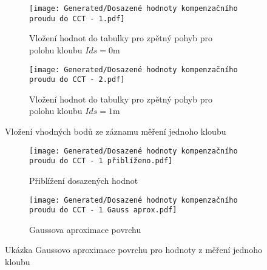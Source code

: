 \begin{landscapeimagepage}
    \begin{figure}[H]
        \centering
        \begin{subfigure}{.5\textheight}
            \centering
            \texttt{[image: Generated/Dosazené hodnoty kompenzačního proudu do CCT - 1.pdf]}
            \caption{Vložení hodnot do tabulky pro zpětný pohyb pro polohu kloubu $Ids = 0 $m}
            \label{fig:Vložení hodnot do tabulky pro zpětný pohyb pro polohu kloubu Ids = 0 m}
        \end{subfigure}
        \hspace{2.5cm}
        \begin{subfigure}{.5\textheight}
            \centering
            \texttt{[image: Generated/Dosazené hodnoty kompenzačního proudu do CCT - 2.pdf]}
            \caption{Vložení hodnot do tabulky pro zpětný pohyb pro polohu kloubu $Ids = 1 $m}
            \label{fig:Vložení hodnot do tabulky pro zpětný pohyb pro polohu kloubu Ids = 1 m}
        \end{subfigure}
        \caption{Vložení vhodných bodů ze záznamu měření jednoho kloubu}
        \label{}
    \end{figure}
    \begin{figure}[H]
        \centering
        \begin{subfigure}{.5\textheight}
            \centering
            \texttt{[image: Generated/Dosazené hodnoty kompenzačního proudu do CCT - 1 přiblíženo.pdf]}
            \caption{Přiblížení dosazených hodnot}
            \label{}
        \end{subfigure}
        \hspace{2.5cm}
        \begin{subfigure}{.5\textheight}
            \centering
            \texttt{[image: Generated/Dosazené hodnoty kompenzačního proudu do CCT - 1 Gauss aprox.pdf]}
            \caption{Gaussova aproximace povrchu}
            \label{}
        \end{subfigure}
        \caption{Ukázka Gaussovo aproximace povrchu pro hodnoty z měření jednoho kloubu}
        \label{fig: Ukázka aktualizace CCT pomocí hodnot z měření jednoho kloubu pomocí Gaussovo aproximace}
    \end{figure}
\end{landscapeimagepage}

